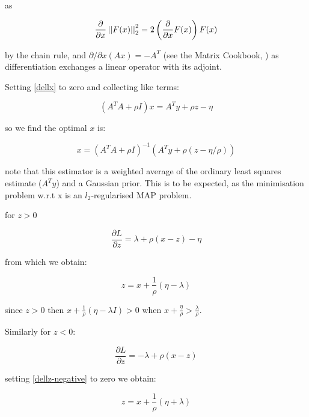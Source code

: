 \begin{example}[LASSO]
as 

\begin{equation}
\frac{\partial}{\partial x} \left|\left|F(x)\right|\right|_2^2 = 2\left(\frac{\partial}{\partial x} F(x)\right) F(x) 
\label{dellx}
\end{equation}

by the chain rule, and \(\partial/\partial x (Ax) = -A^T\) (see the Matrix Cookbook, \cite{petersen2008matrix}) as differentiation exchanges a linear operator with its adjoint.

Setting \eqref{dellx} to zero and collecting like terms:

\begin{equation}
\left(A^TA + \rho I\right)x = A^Ty + \rho z - \eta
\end{equation}

so we find the optimal \(x\) is:

\begin{equation}
x = \left(A^T A + \rho I\right)^{-1}\left(A^Ty + \rho \left( z - \eta/\rho\right)\right)
\label{optx}
\end{equation}

note that this estimator is a weighted average of the ordinary least squares estimate (\(A^Ty\)) and a Gaussian prior. This is to be expected, as the minimisation problem w.r.t x is an \(l_2\)-regularised MAP problem.

for \(z > 0\)

\begin{equation}
\frac{\partial L} {\partial z} = \lambda + \rho (x-z) - \eta
\label{dellz-positive}
\end{equation}

from which we obtain:

\begin{equation*}
z = x + \frac{1}{\rho} ( \eta - \lambda )
\end{equation*}

since \(z>0\) then \(x + \frac{1}{\rho} ( \eta - \lambda I) > 0\) when \(x + \frac{\eta}{\rho} > \frac{\lambda}{\rho}\).

Similarly for \(z < 0\):

\begin{equation}
\frac{\partial L} {\partial z} = -\lambda + \rho (x-z) 
\label{dellz-negative}
\end{equation}

setting \eqref{dellz-negative} to zero we obtain:

\begin{equation*}
z = x + \frac{1}{\rho}(\eta + \lambda)
\end{equation*}


\end{example}
